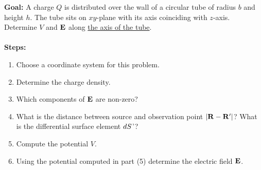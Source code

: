\documentclass[../../header.tex]{subfiles}
\begin{document}
\textbf{Goal:} A charge $Q$ is distributed over the wall of a circular tube of radius $b$ and height $h$. The tube sits on $xy$-plane with its axis coinciding with $z$-axis. Determine $V$ and $\mathbf{E}$ along \underline{the axis of the tube}. \\
\\
\textbf{Steps:} 
\begin{enumerate}
\item Choose a coordinate system for this problem. 


\item Determine the charge density. 


\item Which components of $\mathbf{E}$ are non-zero? 


\item What is the distance between source and observation point $\left|\mathbf{R} - \mathbf{R}'\right|$? What is the differential surface element $d{}S$'? 


\item Compute the potential $V$. 


\item Using the potential computed in part (5) determine the electric field $\mathbf{E}$. 
\end{enumerate}
\end{document}
